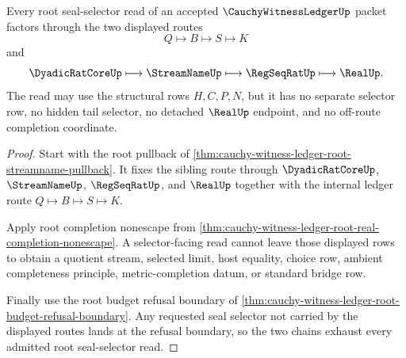 \begin{theorem}
\label{thm:cauchy-witness-ledger-root-seal-selector-exhaustion}
Every root seal-selector read of an accepted $\CauchyWitnessLedgerUp$ packet factors through the two displayed routes
$$
Q \longmapsto B \longmapsto S \longmapsto K
$$
and
$$
\DyadicRatCoreUp \longmapsto \StreamNameUp \longmapsto \RegSeqRatUp \longmapsto \RealUp.
$$
The read may use the structural rows $H,C,P,N$, but it has no separate selector row, no hidden tail selector, no detached $\RealUp$ endpoint, and no off-route completion coordinate.
\end{theorem}
\begin{proof}
Start with the root pullback of \autoref{thm:cauchy-witness-ledger-root-streamname-pullback}. It fixes the sibling route through $\DyadicRatCoreUp$, $\StreamNameUp$, $\RegSeqRatUp$, and $\RealUp$ together with the internal ledger route $Q \longmapsto B \longmapsto S \longmapsto K$.

Apply root completion nonescape from \autoref{thm:cauchy-witness-ledger-root-real-completion-nonescape}. A selector-facing read cannot leave those displayed rows to obtain a quotient stream, selected limit, host equality, choice row, ambient completeness principle, metric-completion datum, or standard bridge row.

Finally use the root budget refusal boundary of \autoref{thm:cauchy-witness-ledger-root-budget-refusal-boundary}. Any requested seal selector not carried by the displayed routes lands at the refusal boundary, so the two chains exhaust every admitted root seal-selector read.
\end{proof}

